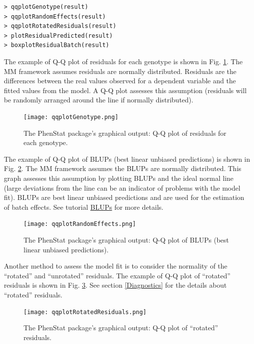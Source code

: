 \documentclass[12pt,a4paper]{article}
\begin{document}
\begingroup
    \fontsize{8pt}{12pt}\selectfont
\begin{verbatim}
> qqplotGenotype(result)
> qqplotRandomEffects(result)
> qqplotRotatedResiduals(result)
> plotResidualPredicted(result)
> boxplotResidualBatch(result)
\end{verbatim}
\endgroup 

The example of Q-Q plot of residuals for each genotype is shown in Fig. \ref{fig:10}. The MM framework assumes residuals are normally distributed. Residuals are the differences between the real values observed for a dependent variable and the fitted values from the model. A Q-Q plot assesses this assumption (residuals will be randomly arranged around the line if normally distributed). 
\begin{figure}[!tpb]%
\centerline{\texttt{[image: qqplotGenotype.png]}}
\caption{The PhenStat package's graphical output: Q-Q plot of residuals for each genotype.}\label{fig:10}
\end{figure}


The example of Q-Q plot of BLUPs (best linear unbiased predictions) is shown in Fig. \ref{fig:11}. The MM framework assumes the BLUPs are normally distributed. This graph assesses this assumption by plotting BLUPs and the ideal normal line (large deviations from the line can be an indicator of problems with the model fit). BLUPs are best linear unbiased predictions and are used for the estimation of batch effects. See tutorial \href{http://www.extension.org/pages/61006/the-solcap-tomato-phenotypic-data:-estimating-heritability-and-blups-for-traits#.Ui4zjWRgYXc}{BLUPs} for more details.

\begin{figure}[!htpb]%
\centerline{\texttt{[image: qqplotRandomEffects.png]}}
\caption{The PhenStat package's graphical output: Q-Q plot of BLUPs (best linear unbiased predictions).}\label{fig:11}
\end{figure}

Another method to assess the model fit is to consider the normality of the ``rotated'' and ``unrotated'' residuals. The example of Q-Q plot of ``rotated'' residuals is shown in Fig. \ref{fig:12}. 
See section \ref{Diagnostics} for the details about ``rotated'' residuals.

\begin{figure}[!htpb]%
\centerline{\texttt{[image: qqplotRotatedResiduals.png]}}
\caption{The PhenStat package's graphical output: Q-Q plot of ``rotated'' residuals.}\label{fig:12}
\end{figure}
\end{document}
